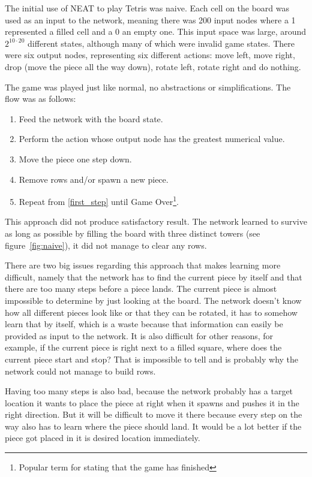 \documentclass{article}
\begin{document}
The initial use of NEAT to play Tetris was naive. Each cell on the board was used as an input to the network, meaning there was 200 input nodes where a 1 represented a filled cell and a 0 an empty one. This input space was large, around $2^{10\cdot 20}$ different states, although many of which were invalid game states. There were six output nodes, representing six different actions: move left, move right, drop (move the piece all the way down), rotate left, rotate right and do nothing.

The game was played just like normal, no abstractions or simplifications. The flow was as follows:

\begin{enumerate}
    \item Feed the network with the board state.\label{first_step}
    \item Perform the action whose output node has the greatest numerical value.
    \item Move the piece one step down.
    \item Remove rows and/or spawn a new piece.
    \item Repeat from \ref{first_step} until Game Over\footnote{Popular term for stating that the game has finished}.
\end{enumerate}

This approach did not produce satisfactory result. The network learned to survive as long as possible by filling the board with three distinct towers (see figure~\ref{fig:naive}), it did not manage to clear any rows.

There are two big issues regarding this approach that makes learning more difficult, namely that the network has to find the current piece by itself and that there are too many steps before a piece lands.
The current piece is almost impossible to determine by just looking at the board. The network doesn't know how all different pieces look like or that they can be rotated, it has to somehow learn that by itself, which is a waste because that information can easily be provided as input to the network. It is also difficult for other reasons, for example, if the current piece is right next to a filled square, where does the current piece start and stop? That is impossible to tell and is probably why the network could not manage to build rows.

Having too many steps is also bad, because the network probably has a target location it wants to place the piece at right when it spawns and pushes it in the right direction. But it will be difficult to move it there because every step on the way also has to learn where the piece should land. It would be a lot better if the piece got placed in it is desired location immediately.
\end{document}
